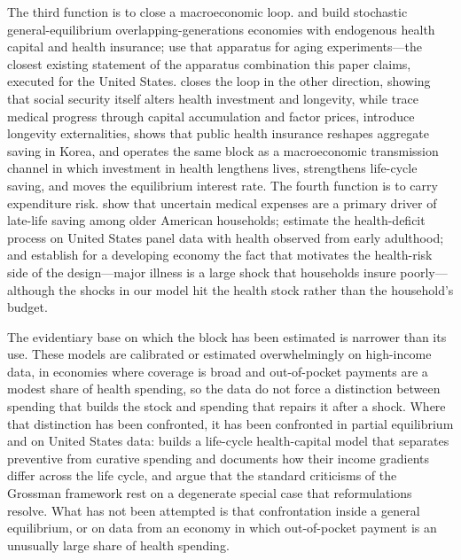 \documentclass[12pt,a4paper]{article}
\begin{document}
The third function is to close a macroeconomic loop. \citet{JungTran2016} and \citet{JungTranChambers2017} build stochastic general-equilibrium overlapping-generations economies with endogenous health capital and health insurance; \citet{JungTranChambers2017} use that apparatus for aging experiments---the closest existing statement of
the apparatus combination this paper claims, executed for the United States.
\citet{Zhao2014} closes the loop in the other direction, showing that social
security itself alters health investment and longevity, while
\citet{FrankovicWrzaczek2020} trace medical progress through capital
accumulation and factor prices, \citet{YewZhang2018} introduce longevity
externalities, \citet{Lim2020} shows that public health insurance reshapes
aggregate saving in Korea, and \citet{Carrasco2026} operates the same block as a
macroeconomic transmission channel in which investment in health lengthens
lives, strengthens life-cycle saving, and moves the equilibrium interest rate.
The fourth function is to carry expenditure risk. \citet{DeNardi2010} show that
uncertain medical expenses are a primary driver of late-life saving among older
American households; \citet{HosseiniKopeckyZhao} estimate the health-deficit
process on United States panel data with health observed from early adulthood;
and \citet{GertlerGruber2002} establish for a developing economy the fact that
motivates the health-risk side of the design---major illness is a large shock that households
insure poorly---although the shocks in our model hit the health stock rather than the household's budget.

The evidentiary base on which the block has been estimated is narrower than its
use. These models are calibrated or estimated overwhelmingly on high-income
data, in economies where coverage is broad and out-of-pocket payments are a
modest share of health spending, so the data do not force a distinction between
spending that builds the stock and spending that repairs it after a shock.
Where that distinction has been confronted, it has been confronted in partial
equilibrium and on United States data: \citet{Ozkan2025} builds a life-cycle
health-capital model that separates preventive from curative spending and
documents how their income gradients differ across the life cycle, and
\citet{GalamaVanKippersluis2013} argue that the standard criticisms of the
Grossman framework rest on a degenerate special case that reformulations
resolve. What has not been attempted is that confrontation inside a general
equilibrium, or on data from an economy in which out-of-pocket payment is an
unusually large share of health spending.
\end{document}

